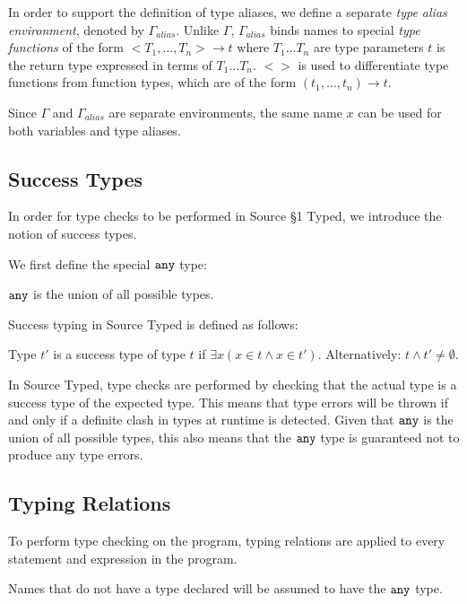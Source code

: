 In order to support the definition of type aliases, we define a separate
\emph{type alias environment}, denoted by $\Gamma_{alias}$. Unlike $\Gamma$,
$\Gamma_{alias}$ binds names to special \emph{type functions} of the form $<T_1, \ldots, T_n> \rightarrow t$
where $T_1 \ldots T_n$ are type parameters $t$ is the return type expressed in terms of $T_1 \ldots T_n$.
$<>$ is used to differentiate type functions from function types, which are of the form $(t_1, \ldots, t_n) \rightarrow t$.

Since $\Gamma$ and $\Gamma_{alias}$ are separate environments, the same name $x$ can be used for both variables and type aliases.

\subsection{Success Types}

In order for type checks to be performed in Source \S 1 Typed, we introduce the notion of success types.

We first define the special $\texttt{any}$ type:
\begin{definition}
$\texttt{any}$ is the union of all possible types.
\end{definition}

Success typing in Source Typed is defined as follows:

\begin{definition}
Type $t'$ is a success type of type $t$ if $\exists x (x \in t \wedge x \in t')$.
Alternatively: $t \wedge t' \neq \emptyset$.
\end{definition}

In Source Typed, type checks are performed by checking that the actual type is a success type of the expected type.
This means that type errors will be thrown if and only if a definite clash in types at runtime is detected.
Given that $\texttt{any}$ is the union of all possible types, this also means that the $\texttt{any}$ type is guaranteed not to produce any type errors.

\subsection{Typing Relations}
\label{typing-rules}

To perform type checking on the program, typing relations are applied to every statement and expression in the program.

Names that do not have a type declared will be assumed to have the $\texttt{any}$ type.

